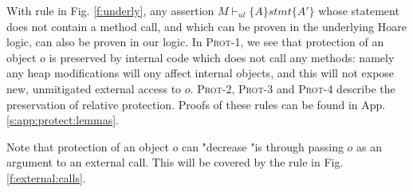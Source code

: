 With rule {} in Fig. \ref{f:underly},  any assertion $M \vdash_{ul} \{ A \} stmt \{ A' \}$  whose statement does not contain a method call, and which 
can be proven in the underlying Hoare logic, can also be proven in our logic. %
In \textsc{Prot-1}, we see that  protection of an object $o$ is preserved by internal code which does not call any methods: namely any heap modifications will
ony affect internal objects, and this will not expose new, unmitigated external access to $o$.
 \textsc{Prot-2}, \textsc{Prot-3} and \textsc{Prot-4} describe the preservation of relative protection.
Proofs of these rules can be found in App. \ref{s:app:protect:lemmas}. 

Note that  protection  of an object $o$ can "decrease "is through  passing   %
$o$  as an argument to an external call. This will be  covered by the rule in Fig. \ref{f:external:calls}.



  



